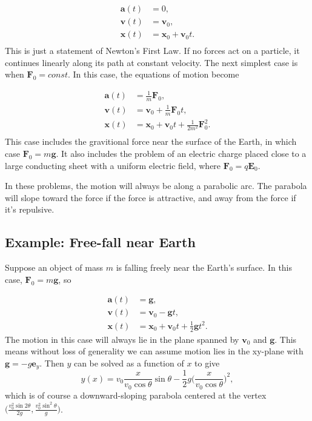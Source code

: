 \documentclass[
  letterpaper,
  DIV=11,
  numbers=noendperiod]{scrreprt}
\begin{document}
\[
\begin{align*}
\mathbf{a}(t) &= 0, \\
\mathbf{v}(t) &= \mathbf{v}_0, \\
\mathbf{x}(t) &= \mathbf{x}_0 + \mathbf{v}_0t. \\
\end{align*}
\] This is just a statement of Newton's First Law. If no forces act on a
particle, it continues linearly along its path at constant velocity. The
next simplest case is when \(\mathbf{F}_0=const\). In this case, the
equations of motion become

\[
\begin{align*}
\mathbf{a}(t) &= \frac{1}{m}\mathbf{F}_0, \\
\mathbf{v}(t) &= \mathbf{v}_0 + \frac{1}{m}\mathbf{F}_0 t, \\
\mathbf{x}(t) &= \mathbf{x}_0 + \mathbf{v}_0t + \frac{1}{2m^2}\mathbf{F}_0^2. \\
\end{align*}
\] This case includes the gravitional force near the surface of the
Earth, in which case \(\mathbf{F}_0=m\mathbf{g}\). It also includes the
problem of an electric charge placed close to a large conducting sheet
with a uniform electric field, where \(\mathbf{F}_0=q\mathbf{E}_0\).

In these problems, the motion will always be along a parabolic arc. The
parabola will slope toward the force if the force is attractive, and
away from the force if it's repulsive.

\hypertarget{example-free-fall-near-earth}{%
\subsection{Example: Free-fall near
Earth}\label{example-free-fall-near-earth}}

Suppose an object of mass \(m\) is falling freely near the Earth's
surface. In this case, \(\mathbf{F}_0 = m\mathbf{g}\), so

\[
\begin{align*}
\mathbf{a}(t) &= \mathbf{g}, \\
\mathbf{v}(t) &= \mathbf{v}_0 - \mathbf{g}t, \\
\mathbf{x}(t) &= \mathbf{x}_0 + \mathbf{v}_0t + \frac{1}{2}\mathbf{g}t^2.
\end{align*}
\] The motion in this case will always lie in the plane spanned by
\(\mathbf{v}_0\) and \(\mathbf{g}\). This means without loss of
generality we can assume motion lies in the xy-plane with
\(\mathbf{g} = -g\mathbf{e}_y\). Then \(y\) can be solved as a function
of \(x\) to give \[
y(x) = v_{0}\frac{x}{v_0 \cos \theta}\sin \theta - \frac{1}{2} g\bigg(\frac{x}{v_0 \cos \theta}\bigg)^2,
\] which is of course a downward-sloping parabola centered at the vertex
\(\big(\frac{v_0^2 \sin 2\theta}{2g}, \frac{v_0^2 \sin^2 \theta}{g}\big)\).
\end{document}
